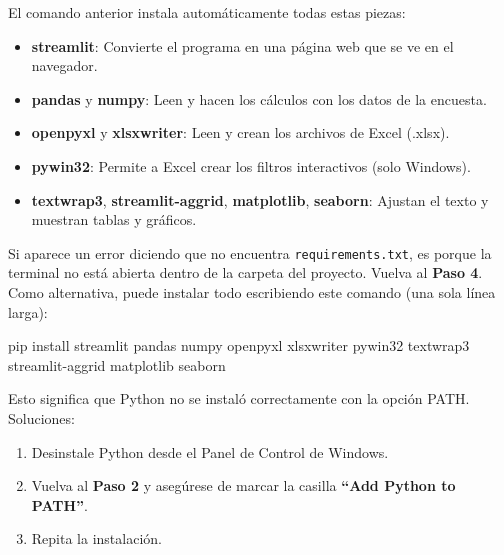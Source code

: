\documentclass[12pt, letterpaper]{article}
\begin{document}
\begin{info}
  El comando anterior instala automáticamente todas estas piezas:
  \begin{itemize}[leftmargin=0.5cm]
    \item \textbf{streamlit}: Convierte el programa en una página web que se ve en el navegador.
    \item \textbf{pandas} y \textbf{numpy}: Leen y hacen los cálculos con los datos de la encuesta.
    \item \textbf{openpyxl} y \textbf{xlsxwriter}: Leen y crean los archivos de Excel (.xlsx).
    \item \textbf{pywin32}: Permite a Excel crear los filtros interactivos (solo Windows).
    \item \textbf{textwrap3}, \textbf{streamlit-aggrid}, \textbf{matplotlib}, \textbf{seaborn}: Ajustan el texto y muestran tablas y gráficos.
  \end{itemize}
\end{info}

\begin{aviso}
  Si aparece un error diciendo que no encuentra \texttt{requirements.txt}, es porque la terminal no está abierta dentro de la carpeta del proyecto. Vuelva al \textbf{Paso 4}. Como alternativa, puede instalar todo escribiendo este comando (una sola línea larga):
  \begin{comando}
    pip install streamlit pandas numpy openpyxl xlsxwriter pywin32 textwrap3 streamlit-aggrid matplotlib seaborn
  \end{comando}
\end{aviso}

\begin{solucion}
  Esto significa que Python no se instaló correctamente con la opción PATH. Soluciones:
  \begin{enumerate}[leftmargin=0.5cm, label=\textcolor{rojopeligro}{\arabic*.}]
    \item Desinstale Python desde el Panel de Control de Windows.
    \item Vuelva al \textbf{Paso 2} y asegúrese de marcar la casilla \textbf{``Add Python to PATH''}.
    \item Repita la instalación.
  \end{enumerate}
\end{solucion}

\end{document}
